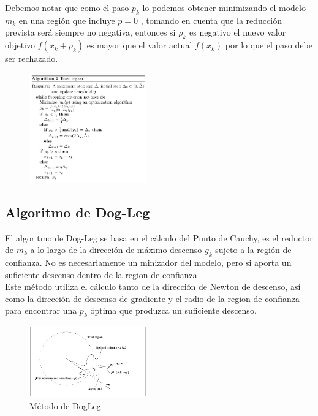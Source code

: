 \documentclass[10pt,journal,compsoc]{styles/IEEEtran}
\begin{document}
Debemos notar  que como el paso $p_k$ lo podemos obtener  minimizando el modelo $m_k$
en una regi\'on que incluye $p = 0$ , tomando en cuenta que la reducci\'on prevista ser\'a siempre no negativa, entonces si $\rho_k$ es negativo el nuevo valor objetivo $f(x_k+p_k)$ es mayor que el valor actual $f(x_k)$ por lo que el paso debe ser rechazado.\\

\begin{figure}[hbtp]
\centering
\includegraphics[width=0.45\textwidth]{TrustRegion.png}
\caption{}
\end{figure}


\subsection{Algoritmo de Dog-Leg}

El algoritmo de Dog-Leg se basa en el c\'alculo del Punto de Cauchy, es el reductor de $m_k$ a lo largo de la direcci\'on de m\'aximo descenso $g_k$  sujeto a la regi\'on de confianza. No es necesariamente un minizador del modelo, pero si aporta un suficiente descenso dentro de la region de confianza\\

Este m\'etodo utiliza el c\'alculo tanto de la direcci\'on de Newton de descenso, as\'i como la direcci\'on de descenso de gradiente y el radio de la region de confianza para encontrar una $p_k$ \'optima que produzca un suficiente descenso.

\begin{figure}[hbtp]
\centering
\includegraphics[width=0.45\textwidth]{dogleggraph.png}
\caption{M\'etodo de DogLeg}
\end{figure}
 
\end{document}
